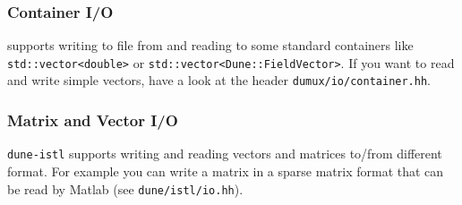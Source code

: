 \subsubsection{Container I/O}
\Dumux supports writing to file from and reading to some standard \Cplusplus containers like \texttt{std::vector<double>} or \texttt{std::vector<Dune::FieldVector>}.
If you want to read and write simple vectors, have a look at the header \texttt{dumux/io/container.hh}.

\subsubsection{Matrix and Vector I/O}
\texttt{dune-istl} supports writing and reading vectors and matrices to/from different format. For example you can write a matrix in a sparse matrix format that
can be read by Matlab (see \texttt{dune/istl/io.hh}).
